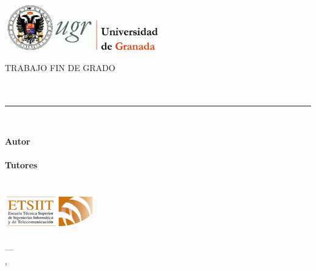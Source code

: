 \documentclass[../proyecto.tex]{book}
\begin{document}
\begin{titlingpage}

  \newlength{\centeroffset}
  \setlength{\centeroffset}{-0.5\oddsidemargin}
  \addtolength{\centeroffset}{0.5\evensidemargin}
  \thispagestyle{empty}

  \noindent\hspace*{\centeroffset}
  \begin{minipage}{\textwidth}
    \vspace{-2cm}
    \centering
    \includegraphics[width=0.5\textwidth]{images/logo_ugr.jpg}

    \textsc{ \Large TRABAJO FIN DE GRADO\\[0.2cm]}
    \textsc{ \Degree }\\[1cm]

    {\Large\bfseries \ProjectTitle\\
    }
    \noindent\rule[-1ex]{\textwidth}{3pt}\\[3.5ex]
  \end{minipage}

  \vspace{2cm}
  \noindent\hspace*{\centeroffset}\begin{minipage}{\textwidth}
    \centering

    \textbf{Autor}\\ {\AuthorName}\\[2.5ex]
    \textbf{Tutores}\\
    {\MainProf\\
     \SecondProf}\\[2cm]
    \includegraphics[width=0.3\textwidth]{images/etsiit_logo.png}\\[0.1cm]
    \textsc{\Faculty}\\
    \textsc{---}\\
    \Location, \Time
  \end{minipage}

\end{titlingpage}
\end{document}
